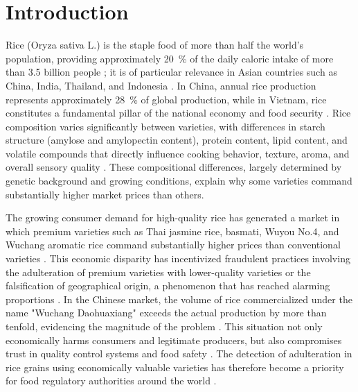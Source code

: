 \documentclass[final,5p,times,twocolumn]{elsarticle}
\begin{document}

\section{Introduction}\label{sec1}

Rice (Oryza sativa L.) is the staple food of more than half the world's population, providing approximately 20~\% of the daily caloric intake of more than 3.5 billion people \cite{subbuthavamurugan2023}; it is of particular relevance in Asian countries such as China, India, Thailand, and Indonesia \cite{Muthayya2014}. 
In China, annual rice production represents approximately 28~\% of global production, while in Vietnam, rice constitutes a fundamental pillar of the national economy and food security \cite{Giang2020b, Tong2021}. 
Rice composition varies significantly between varieties, with differences in starch structure (amylose and amylopectin content), protein content, lipid content, and volatile compounds that directly influence cooking behavior, texture, aroma, and overall sensory quality \cite{Sampaio2019,Xie2024}. 
These compositional differences, largely determined by genetic background and growing conditions, explain why some varieties command substantially higher market prices than others.

The growing consumer demand for high-quality rice has generated a market in which premium varieties such as Thai jasmine rice, basmati, Wuyou No.4, and Wuchang aromatic rice command substantially higher prices than conventional varieties \cite{Teye2022, Tong2021, Sun2025, Zaresani2024}. 
This economic disparity has incentivized fraudulent practices involving the adulteration of premium varieties with lower-quality varieties or the falsification of geographical origin, a phenomenon that has reached alarming proportions \cite{Teye2022, SliwinskaBartel2021}. 
In the Chinese market, the volume of rice commercialized under the name "Wuchang Daohuaxiang" exceeds the actual production by more than tenfold, evidencing the magnitude of the problem \cite{Sun2025, Li2025}. 
This situation not only economically harms consumers and legitimate producers, but also compromises trust in quality control systems and food safety \cite{Shi2025, Rahmani2022, SliwinskaBartel2021}. 
The detection of adulteration in rice grains using economically valuable varieties has therefore become a priority for food regulatory authorities around the world \cite{Teye2022, Edris2024}.
\end{document}
